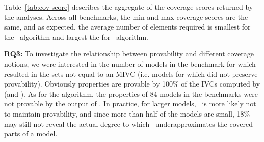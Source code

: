 

Table~\ref{tab:cov-score} describes the aggregate of the coverage scores returned by the analyses.  Across all benchmarks, the min and max coverage scores are the same, and as expected, the average number of elements required is smallest for the \mustalg\ algorithm and largest the for \ucalg\ algorithm.



\textbf{RQ3:}
To investigate the relationship between provability and different coverage notions,
we were interested in the number of models in the benchmark for which
\mustalg resulted in the sets not equal to an MIVC (i.e. models for which
\mustalg did not preserve provability).
Obviously properties are provable by 100\% of the IVCs computed by \ucalg (and \ucbfalg).
As for the \mustalg algorithm, the properties of 84 models in the benchmarks were not provable by the output of \mustalg. In practice, for larger models, \mustcov\ is more likely not to maintain provability,
 and since more than half of the models are small, 18\% may still not reveal the actual degree
 to which \mustcov\ underapproximates the covered parts of a model.

\vspace{-0.1in} 